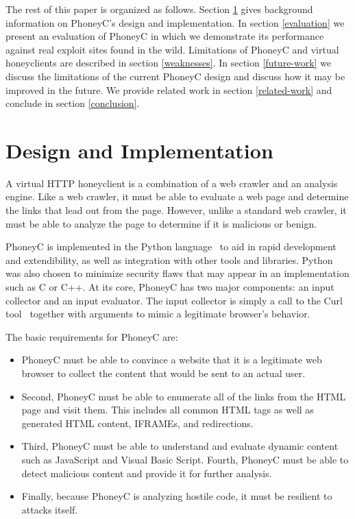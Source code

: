 \documentclass[10pt,twocolumn]{article}
\begin{document}
The rest of this paper is organized as follows. Section \ref{design} gives background information on PhoneyC's design and implementation. In section \ref{evaluation} we present an evaluation of PhoneyC in which we demonstrate its performance against real exploit sites found in the wild. Limitations of PhoneyC and virtual honeyclients are described in section \ref{weaknesses}. In section \ref{future-work} we discuss the limitations of the current PhoneyC design and discuss how it may be improved in the future. We provide related work in section \ref{related-work} and conclude in section \ref{conclusion}.

\section{Design and Implementation}
\label{design}

A virtual HTTP honeyclient is a combination of a web crawler and an analysis engine. Like a web crawler, it must be able to evaluate a web page and determine the links that lead out from the page. However, unlike a standard web crawler, it must be able to analyze the page to determine if it is malicious or benign. 

PhoneyC is implemented in the Python language~\cite{vanrossum2001plw} to aid in rapid development and extendibility, as well as integration with other tools and libraries. Python was also chosen to minimize security flaws that may appear in an implementation such as C or C++. At its core, PhoneyC has two major components: an input collector and an input evaluator. The input collector is simply a call to the Curl tool~\cite{ward2003clw} together with arguments to mimic a legitimate browser's behavior.

The basic requirements for PhoneyC are:
\begin{itemize}
	\item{PhoneyC must be able to convince a website that it is a legitimate web browser to collect the content that would be sent to an actual user.}
	\item{Second, PhoneyC must be able to enumerate all of the links from the HTML page and visit them. This includes all common HTML tags as well as generated HTML content, IFRAMEs, and redirections.} 
	\item{Third, PhoneyC must be able to understand and evaluate dynamic content such as JavaScript and Visual Basic Script. Fourth, PhoneyC must be able to detect malicious content and provide it for further analysis.} 
	\item{Finally, because PhoneyC is analyzing hostile code, it must be resilient to attacks itself.}
\end{itemize}
\end{document}

